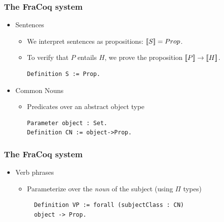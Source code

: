 \documentclass[11pt]{beamer}
\begin{document}
\begin{frame}[fragile]
	\frametitle{The FraCoq system}
	
	\begin{itemize}
		
\item Sentences

	\begin{itemize}
		
		\item We interpret sentences as propositions: $\mathop{\lbrack\!\lbrack S\rbrack\!\rbrack}\nolimits =
		Prop$. 
		
		\item To verify that
		$P$ entails $H$, we prove the proposition $\mathop{\lbrack\!\lbrack P\rbrack\!\rbrack}\nolimits \to \mathop{\lbrack\!\lbrack H\rbrack\!\rbrack}\nolimits$.
		
		\begin{verbatim}
Definition S := Prop.
		\end{verbatim}



\end{itemize}
\item Common Nouns
	\begin{itemize}
		
		\item Predicates over an abstract object type
		
			\begin{verbatim}
Parameter object : Set.
Definition CN := object->Prop.
			\end{verbatim}
			
\end{itemize}\end{itemize}
\end{frame}
\begin{frame}[fragile]
	\frametitle{The FraCoq system}
	
	\begin{itemize}
		
		\item Verb phrases
		
		\begin{itemize}
			
			\item Parameterize over the
			\emph{noun} of the subject (using $\Pi$ types)
			
			\begin{verbatim}
  Definition VP := forall (subjectClass : CN) 
  object -> Prop.
			\end{verbatim}	
\end{itemize}			
\end{itemize}
\end{frame}
\end{document}
